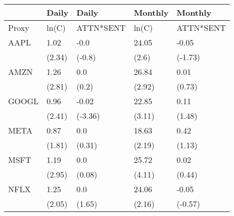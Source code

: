 \begin{tabular}{lllll}
\toprule
{} &   Daily &      Daily & Monthly &    Monthly \\
\midrule
Proxy &   ln(C) &  ATTN*SENT &   ln(C) &  ATTN*SENT \\
AAPL  &    1.02 &       -0.0 &   24.05 &      -0.05 \\
      &  (2.34) &     (-0.8) &   (2.6) &    (-1.73) \\
AMZN  &    1.26 &        0.0 &   26.84 &       0.01 \\
      &  (2.81) &      (0.2) &  (2.92) &     (0.73) \\
GOOGL &    0.96 &      -0.02 &   22.85 &       0.11 \\
      &  (2.41) &    (-3.36) &  (3.11) &     (1.48) \\
META  &    0.87 &        0.0 &   18.63 &       0.42 \\
      &  (1.81) &     (0.31) &  (2.19) &     (1.13) \\
MSFT  &    1.19 &        0.0 &   25.72 &       0.02 \\
      &  (2.95) &     (0.08) &  (4.11) &     (0.44) \\
NFLX  &    1.25 &        0.0 &   24.06 &      -0.05 \\
      &  (2.05) &     (1.65) &  (2.16) &    (-0.57) \\
\bottomrule
\end{tabular}
